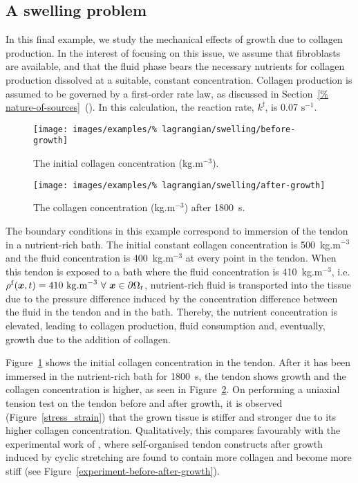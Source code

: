 \subsection{A swelling problem}
\label{swelling-1}

In this final example, we study the mechanical effects of growth due
to collagen production. In the interest of focusing on this issue, we
assume that fibroblasts are available, and that the fluid phase bears
the necessary nutrients for collagen production dissolved at a
suitable, constant concentration. Collagen production is assumed to be
governed by a first-order rate law, as discussed in Section~\ref{%
  nature-of-sources}~(). In this calculation, the
reaction rate, $k^\mathrm{f}$, is 0.07 $\mathrm{s}^{-1}$.

\begin{figure}[!hpt]
  \centering
  \texttt{[image: images/examples/\%
    lagrangian/swelling/before-growth]}
  \caption{The initial collagen concentration (kg.m$^{-3}$).}
  \label{before_growth}
\end{figure}

\begin{figure}[!hpt]
  \centering
  \texttt{[image: images/examples/\%
    lagrangian/swelling/after-growth]}
  \caption{The collagen concentration (kg.m$^{-3}$) after 1800~s.}
  \label{after_growth}
\end{figure}

The boundary conditions in this example correspond to immersion of the
tendon in a nutrient-rich bath. The initial constant collagen
concentration is 500~kg.m$^{-3}$ and the fluid concentration is
400~kg.m$^{-3}$ at every point in the tendon. When this tendon is
exposed to a bath where the fluid concentration is 410~kg.m$^{-3}$,
i.e. $\rho^\mathrm{f}(\bx,t)=410~\mathrm{kg.m}^{-3}\ \forall\ \bx \in
\partial\Omega_t$, nutrient-rich fluid is transported into the tissue
due to the pressure difference induced by the concentration difference
between the fluid in the tendon and in the bath. Thereby, the nutrient
concentration is elevated, leading to collagen production, fluid
consumption and, eventually, growth due to the addition of collagen.

Figure~\ref{before_growth} shows the initial collagen concentration in
the tendon. After it has been immersed in the nutrient-rich bath for
1800~s, the tendon shows growth and the collagen concentration is
higher, as seen in Figure~\ref{after_growth}. On performing a uniaxial
tension test on the tendon before and after growth, it is observed
(Figure~\ref{stress_strain}) that the grown tissue is stiffer and
stronger due to its higher collagen concentration. Qualitatively, this
compares favourably with the experimental work of \citet{arrudaetal%
  05}, where self-organised tendon constructs after growth induced by
cyclic stretching are found to contain more collagen and become more
stiff (see Figure~\ref{experiment-before-after-growth}).

